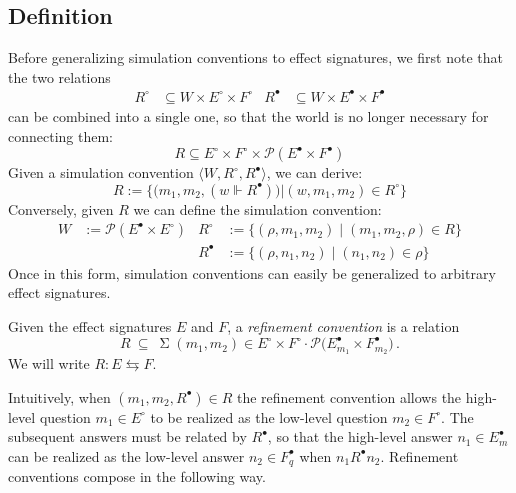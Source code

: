 \documentclass[sigplan,10pt,review,anonymous]{acmart}
\newcommand{\bdot}{\cdot}
\newcommand{\que}{{\circ}}
\newcommand{\ans}{{\bullet}}
\begin{document}

\subsection{Definition} \label{sec:refconvdef} %

Before generalizing simulation conventions to effect signatures,
we first note that the two relations
\begin{align*}
  R^\que &\subseteq W \times E^\que \times F^\que &
  R^\ans &\subseteq W \times E^\ans \times F^\ans
\end{align*}
can be combined into a single one,
so that the world is no longer necessary for connecting them:
\[
  R \subseteq E^\que \times F^\que \times
    \mathcal{P}(E^\ans \times F^\ans)
\]
Given a simulation convention $\langle W, R^\que, R^\ans \rangle$,
we can derive:
\[
  R := \big\{
    \big(m_1, m_2, (w \Vdash R^\ans) \big)
    \mathrel{\big|} (w, m_1, m_2) \in R^\que \big\}
\]
Conversely, given $R$ we can define the simulation convention:
\begin{align*}
  W &:= \mathcal{P}(E^\ans \times E^\que) &
  R^\que &:= \{ (\rho, m_1, m_2) \mid (m_1, m_2, \rho) \in R \} \\&&
  R^\ans &:= \{ (\rho, n_1, n_2) \mid (n_1, n_2) \in \rho \}
\end{align*}
Once in this form,
simulation conventions
can easily be generalized to arbitrary effect signatures.

\begin{definition}
Given the effect signatures $E$ and $F$,
a \emph{refinement convention} is a relation
\[
  R \:\subseteq\:
    \mathop\Sigma {(m_1, m_2) \in E^\que \times F^\que} \bdot
    \mathcal{P} \big( E^\ans_{m_1} \times F^\ans_{m_2} \big) \,.
\]
We will write $R : E \leftrightarrows F$.
\end{definition}

Intuitively,
when $(m_1, m_2, R^\ans) \in R$
the refinement convention allows
the high-level question $m_1 \in E^\que$ to be realized as
the low-level question $m_2 \in F^\que$.
The subsequent answers must be related by $R^\ans$, so that
the high-level answer $n_1 \in E^\ans_m$ can be realized as
the low-level answer $n_2 \in F^\ans_q$ when $n_1 \mathrel{R^\ans} n_2$.
Refinement conventions compose in the following way.
\end{document}

